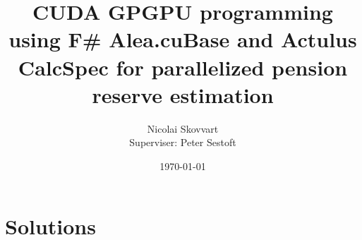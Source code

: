 \documentclass{llncs}
\title{CUDA GPGPU programming using F\# Alea.cuBase and Actulus CalcSpec for parallelized pension reserve estimation}
\author{Nicolai Skovvart \email{nbsk@itu.dk}\\Superviser: Peter Sestoft}
\date{\today}
\institute{IT University of Copenhagen}
\begin{document}
	
	
	\setcounter{page}{1}
	
	\maketitle

	

	\tableofcontents
	\listoffigures

	\clearpage	

	
	

	\section{Solutions}
	
	
	

	
	
	
	
	
	
	
    \clearpage
	\appendix
	\addappheadtotoc
	
\end{document}
